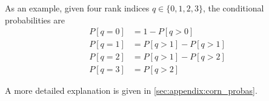 As an example, given four rank indices $q \in \{0, 1, 2, 3\}$,
the conditional probabilities are
\begin{align*}
  P[q=0] &= 1 - P[q>0] \\
  P[q=1] &= P[q>1] - P[q>1] \\
  P[q=2] &= P[q>1] - P[q>2] \\
  P[q=3] &= P[q>2]
\end{align*}

A more detailed explanation is given in \autoref{sec:appendix:corn_probas}.


